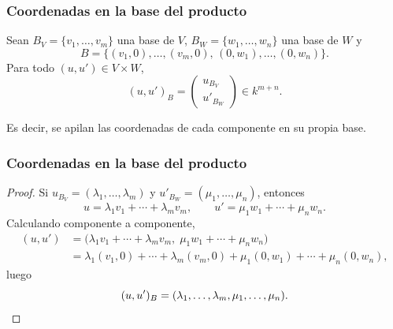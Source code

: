 \begin{frame}
    \frametitle{Coordenadas en la base del producto}

    \begin{proposition}
        Sean $B_V=\{v_1,\ldots,v_m\}$ una base de $V$,
        $B_W=\{w_1,\ldots,w_n\}$ una base de $W$ y
        \[
            B=\{(v_1,0),\ldots,(v_m,0),\,(0,w_1),\ldots,(0,w_n)\}.
        \]
        Para todo $(u,u')\in V\times W$,
        \[
            (u,u')_B=
            \begin{pmatrix}
                u_{B_V}\\
                u'_{B_W}
            \end{pmatrix}
            \in k^{m+n}.
        \]
    \end{proposition}


    Es decir, se \alert{apilan} las coordenadas de cada componente
    en su propia base.
\end{frame}


\begin{frame}
    \frametitle{Coordenadas en la base del producto}

    \begin{proof}
        Si $u_{B_V}=(\lambda_1,\ldots,\lambda_m)$ y
        $u'_{B_W}=(\mu_1,\ldots,\mu_n)$, entonces
        \[
            u=\lambda_1v_1+\cdots+\lambda_mv_m,
            \qquad
            u'=\mu_1w_1+\cdots+\mu_nw_n.
        \]
        Calculando componente a componente,
        \begin{align*}
            (u,u')
            &=
            \bigl(\lambda_1v_1+\cdots+\lambda_mv_m,\;
                  \mu_1w_1+\cdots+\mu_nw_n\bigr)\\
            &=\lambda_1(v_1,0)+\cdots+\lambda_m(v_m,0)
            +\mu_1(0,w_1)+\cdots+\mu_n(0,w_n),
        \end{align*}
        luego
        \[
            (u,u')_B=(\lambda_1,\ldots,\lambda_m,\mu_1,\ldots,\mu_n).
            \qedhere
        \]
    \end{proof}
\end{frame}


